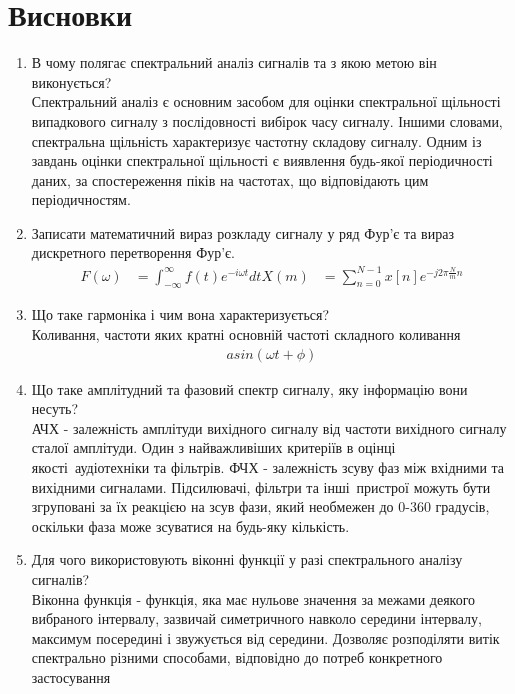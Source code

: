 \section{Висновки}
\label{sec:summary}

\begin{enumerate}
    \item В чому полягає спектральний аналіз сигналів та з якою метою він
          виконується? \\
          Спектральний аналіз є основним засобом для оцінки спектральної
          щільності випадкового сигналу з послідовності вибірок часу сигналу. Іншими
          словами, спектральна щільність характеризує частотну складову сигналу.
          Одним із завдань оцінки спектральної щільності є виявлення будь-якої
          періодичності даних, за спостереження піків на частотах, що відповідають
          цим періодичностям.
    \item Записати математичний вираз розкладу сигналу у ряд Фур’є та
          вираз дискретного перетворення Фур’є.
          \begin{align}
              F(\omega) & = \int_{-\infty}^{\infty} f(t) e^{-i \omega t} dt
              X(m)      & = \sum_{n = 0}^{N - 1} x[n] e^{-j 2 \pi \frac{N}{m} n}
          \end{align}
    \item Що таке гармоніка і чим вона характеризується? \\
          Коливання, частоти яких кратні основній частоті складного коливання
          \begin{align}
              a sin (\omega t + \phi)
          \end{align}
    \item Що таке амплітудний та фазовий спектр сигналу, яку інформацію
          вони несуть? \\
          АЧХ - залежність амплітуди вихідного сигналу від частоти
          вихідного сигналу сталої амплітуди. Один з найважливіших
          критеріїв в оцінці якості аудіотехніки та фільтрів.
          ФЧХ - залежність зсуву фаз між вхідними та вихідними сигналами.
          Підсилювачі, фільтри та інші пристрої можуть бути згруповані за
          їх реакцією на зсув фази, який необмежен до 0-360 градусів,
          оскільки фаза може зсуватися на будь-яку кількість.
    \item Для чого використовують віконні функції у разі спектрального
          аналізу сигналів? \\
          Віконна функція - функція, яка має нульове значення за межами
          деякого вибраного інтервалу, зазвичай симетричного навколо середини інтервалу,
          максимум посередині і звужується від середини.
          Дозволяє розподіляти витік спектрально різними способами,
          відповідно до потреб конкретного застосування
\end{enumerate}
